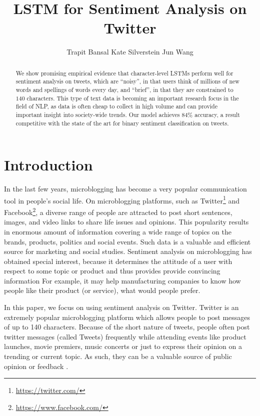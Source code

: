 \documentclass{article} %
\title{LSTM for Sentiment Analysis on Twitter}
\author{
Trapit Bansal
\And
Kate Silverstein
\And
Jun Wang
}
\begin{document}
\maketitle

\begin{abstract}
We show promising empirical evidence that character-level LSTMs perform well for sentiment analysis on tweets, which are ``noisy'', in that users think of millions of new words and spellings of words every day, and ``brief'', in that they are constrained to $140$ characters. This type of text data is becoming an important research focus in the field of NLP, as data is often cheap to collect in high volume and can provide important insight into society-wide trends. Our model achieves $84 \%$ accuracy, a result competitive with the state of the art for binary sentiment classification on tweets.
\end{abstract}

\section{Introduction}
In the last few years, microblogging has become a very popular communication tool in people's social life.
On microblogging platforms, such as Twitter\footnote{\url{https://twitter.com/}} and Facebook\footnote{\url{https://www.facebook.com/}}, a diverse range of people are attracted to post short sentences, images, and video links to share life issues and opinions.
This popularity results in enormous amount of information covering a wide range of topics on the brands, products, politics and social events. 
Such data is a valuable and efficient source for marketing and social studies. 
Sentiment analysis on microblogging has obtained special interest, because it determines the attitude of a user with respect to some topic or product and thus provides provide convincing information
For example, it may help manufacturing companies to know how people like their product (or service), what would people prefer.  

In this paper, we focus on using sentiment analysis on Twitter. 
Twitter is an extremely popular microblogging platform which allows people to post messages of up to 140 characters.
Because of the short nature of tweets, people often post twitter messages (called Tweets) frequently while attending events like product launches, movie premiers, music concerts or just to express their opinion on a trending or current topic.
As such, they can be a valuable source of public opinion or feedback \cite{o2010tweets, bollen2011twitter, bollen2009modeling}.
\end{document}
